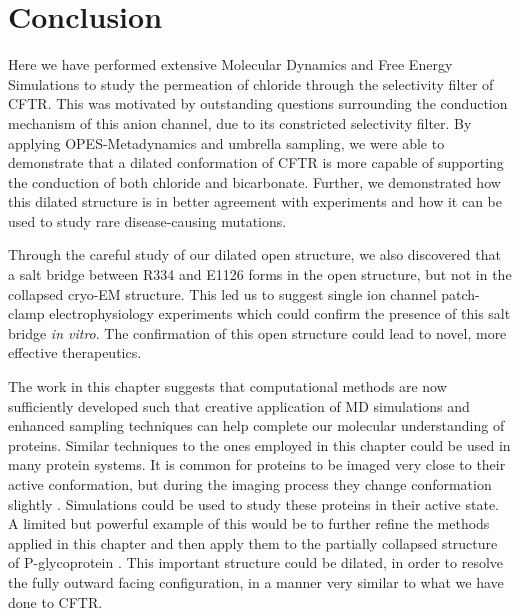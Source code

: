 
\section{Conclusion}
Here we have performed extensive Molecular Dynamics and Free Energy Simulations to study the permeation of chloride through the selectivity filter of CFTR. This was motivated by outstanding questions surrounding the conduction mechanism of this anion channel, due to its constricted selectivity filter. By applying OPES-Metadynamics and umbrella sampling, we were able to demonstrate that a dilated conformation of CFTR is more capable of supporting the conduction of both chloride and bicarbonate. Further, we demonstrated how this dilated structure is in better agreement with experiments and how it can be used to study rare disease-causing mutations.

Through the careful study of our dilated open structure, we also discovered that a salt bridge between R334 and E1126 forms in the open structure, but not in the collapsed cryo-EM structure. This led us to suggest single ion channel patch-clamp electrophysiology experiments which could confirm the presence of this salt bridge \textit{in vitro}. The confirmation of this open structure could lead to novel, more effective therapeutics.

The work in this chapter suggests that computational methods are now sufficiently developed such that creative application of MD simulations and enhanced sampling techniques can help complete our molecular understanding of proteins. Similar techniques to the ones employed in this chapter could be used in many protein systems. It is common for proteins to be imaged very close to their active conformation, but during the imaging process they change conformation slightly \cite{bock2022}. Simulations could be used to study these proteins in their active state. A limited but powerful example of this would be to further refine the methods applied in this chapter and then apply them to the partially collapsed structure of P-glycoprotein \cite{kim2018a}. This important structure could be dilated, in order to resolve the fully outward facing configuration, in a manner very similar to what we have done to CFTR.


